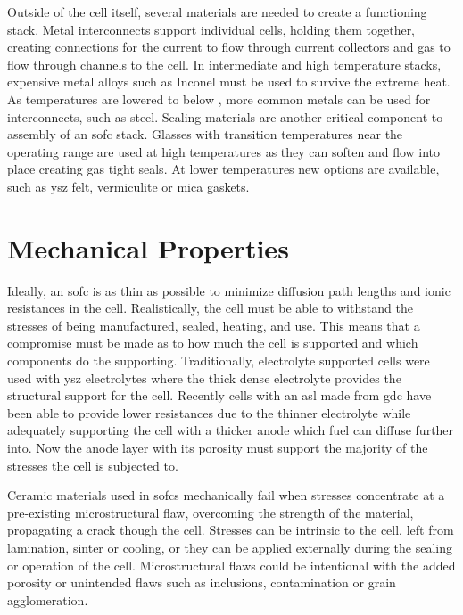     Outside of the cell itself, several materials are needed to create a functioning stack.
    Metal interconnects support individual cells, holding them together, creating connections for the current to flow through current collectors and gas to flow through channels to the cell.\cite{Ki2010}
    In intermediate and high temperature stacks, expensive metal alloys such as Inconel must be used to survive the extreme heat.%
    As temperatures are lowered to below , more common metals can be used for interconnects, such as steel.
    Sealing materials are another critical component to assembly of an \gls{sofc} stack.
    Glasses with transition temperatures near the operating range are used at high temperatures as they can soften and flow into place creating gas tight seals.
    At lower temperatures new options are available, such as \gls{ysz} felt, vermiculite or mica gaskets.%

\section{Mechanical Properties}
    Ideally, an \gls{sofc} is as thin as possible to minimize diffusion path lengths and ionic resistances in the cell.\cite{Chan2001}
    Realistically, the cell must be able to withstand the stresses of being manufactured, sealed, heating, and use.
    This means that a compromise must be made as to how much the cell is supported and which components do the supporting.
    Traditionally, electrolyte supported cells were used with \gls{ysz} electrolytes where the thick dense electrolyte provides the structural support for the cell.
    Recently cells with an \gls{asl} made from \gls{gdc} have been able to provide lower resistances due to the thinner electrolyte while adequately supporting the cell with a thicker anode which fuel can diffuse further into.\cite{Fleischhauer2014a,Laurencin2008}
    Now the anode layer with its porosity must support the majority of the stresses the cell is subjected to.

    Ceramic materials used in \glspl{sofc} mechanically fail when stresses concentrate at a pre-existing microstructural flaw, overcoming the strength of the material, propagating a crack though the cell.
    Stresses can be intrinsic to the cell, left from lamination, sinter or cooling, or they can be applied externally during the sealing or operation of the cell.
    Microstructural flaws could be intentional with the added porosity or unintended flaws such as inclusions, contamination or grain agglomeration.

